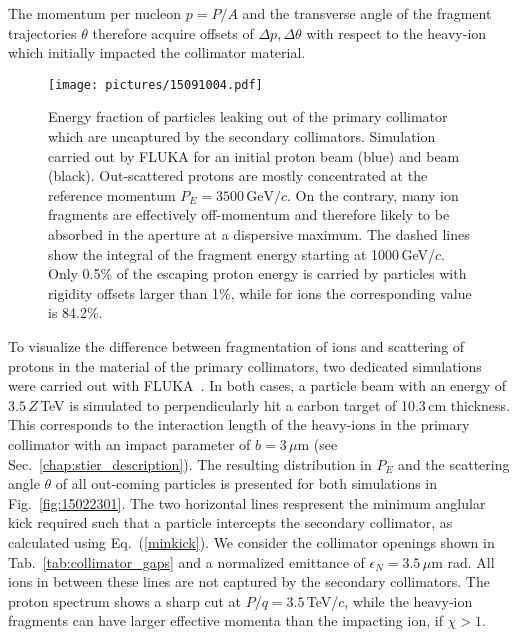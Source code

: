 The momentum per nucleon $p=P/A$ and the transverse angle of the fragment trajectories $\theta$ therefore acquire offsets of $\Delta p,\Delta \theta$ with respect to the heavy-ion which initially impacted the collimator material.



\begin{figure}[b]
  \begin{center}
\texttt{[image: pictures/15091004.pdf]}
\caption{Energy fraction of particles leaking out of the primary collimator which are uncaptured by the secondary collimators. Simulation carried out by FLUKA for an initial proton beam (blue) and \lead beam (black). Out-scattered protons are mostly concentrated at the reference momentum $P_E=3500\,\text{GeV}/c$. On the contrary, many ion fragments are effectively off-momentum and therefore likely to be absorbed in the aperture at a dispersive maximum. The dashed lines show the integral of the fragment energy starting at 1000$\,$GeV/$c$. Only 0.5\% of the escaping proton energy is carried by particles with rigidity offsets larger than 1\%, while for ions the corresponding value is 84.2\%. }
\label{fig:15062510.pdf}
  \end{center}
\end{figure}
 



To visualize the difference between fragmentation of  \lead ions and scattering of protons in the material of the primary collimators, two dedicated simulations were carried out with FLUKA~\cite{bohlen2014fluka,ferrari2005fluka}. In both cases, a particle beam with an energy of $3.5\,Z\,$TeV is simulated to perpendicularly hit a carbon target of 10.3$\,$cm thickness. This corresponds to the interaction length of the heavy-ions in the primary collimator with an impact parameter of $b=3\,\mu$m (see Sec.~\ref{chap:stier_description}). The resulting distribution in $P_E$ and the scattering angle $\theta$ of all out-coming particles is presented for both simulations in Fig.~\ref{fig:15022301}. The two horizontal lines respresent the minimum anglular kick required such that a particle intercepts the secondary collimator, as calculated using Eq.~(\ref{minkick}). We consider the collimator openings shown in Tab.~\ref{tab:collimator_gaps} and a normalized emittance of $\epsilon_N=3.5\,\mu$m rad. All ions in between these lines are not captured by the secondary collimators. The proton spectrum shows a sharp cut at $P/q=3.5\,$TeV/$c$, while the heavy-ion fragments can have larger effective momenta than the impacting ion, if $\chi>1$. 

